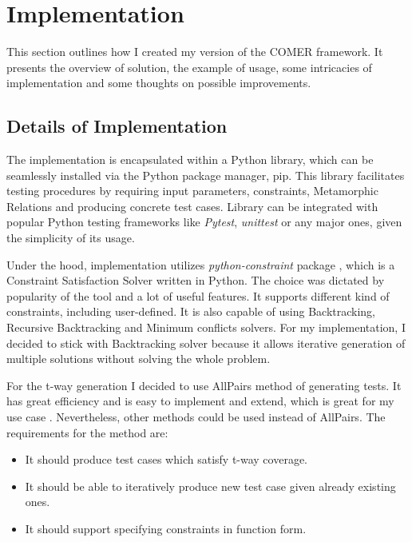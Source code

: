 
\chapter{Implementation}
\label{ch:implementation}

This section outlines how I created my version of the COMER framework. It presents the overview of solution, the example of usage, some intricacies of implementation and some thoughts on possible improvements.

\section{Details of Implementation}\label{sec:details-of-implementation}

The implementation is encapsulated within a Python library, which can be seamlessly installed via the Python package manager, pip.
This library facilitates testing procedures by requiring input parameters, constraints, Metamorphic Relations and producing concrete test cases.
Library can be integrated with popular Python testing frameworks like \textit{Pytest}, \textit{unittest} or any major ones, given the simplicity of its usage.

Under the hood, implementation utilizes \textit{python-constraint} package \cite{python-constraint}, which is a Constraint Satisfaction Solver written in Python. The choice was dictated by popularity of the tool and a lot of useful features. It supports different kind of constraints, including user-defined. It is also capable of using Backtracking, Recursive Backtracking and Minimum conflicts solvers. For my implementation, I decided to stick with Backtracking solver because it allows iterative generation of multiple solutions without solving the whole problem.

For the t-way generation I decided to use AllPairs method of generating tests. It has great efficiency and is easy to implement and extend, which is great for my use case \cite{pairwise}. Nevertheless, other methods could be used instead of AllPairs. The requirements for the method are:
\begin{itemize}
	\item It should produce test cases which satisfy t-way coverage.
	\item It should be able to iteratively produce new test case given already existing ones.
	\item It should support specifying constraints in function form.
\end{itemize}

